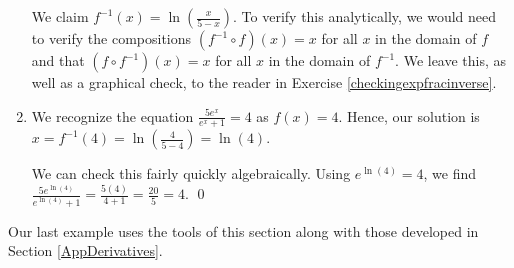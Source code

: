 \documentclass{ximera}
\begin{document}
\begin{example}
\begin{enumerate}
We claim $f^{-1}(x) = \ln\left(\frac{x}{5-x}\right)$.  To verify this analytically, we would need to verify the compositions $\left(f^{-1} \circ f\right)(x) = x$ for all $x$ in the domain of $f$ and that $\left(f \circ f^{-1}\right)(x) = x$ for all $x$ in the domain of $f^{-1}$.   We leave this, as well as a graphical check, to the reader in Exercise \ref{checkingexpfracinverse}.




\item We recognize the equation $\frac{5e^{x}}{e^{x}+1} = 4$ as $f(x) = 4$.  Hence, our solution is $x = f^{-1}(4) = \ln\left(\frac{4}{5-4}\right) = \ln(4)$.  

We can check this fairly quickly algebraically.  Using  $e^{\ln(4)} = 4$, we find $\frac{5e^{\ln(4)}}{e^{\ln(4)}+1}  = \frac{5(4)}{4+1} = \frac{20}{5} = 4$. \qed

\end{enumerate}

\end{example}

\pagebreak

Our last example uses the tools of this section along with those developed in Section \ref{AppDerivatives}.
\end{document}
